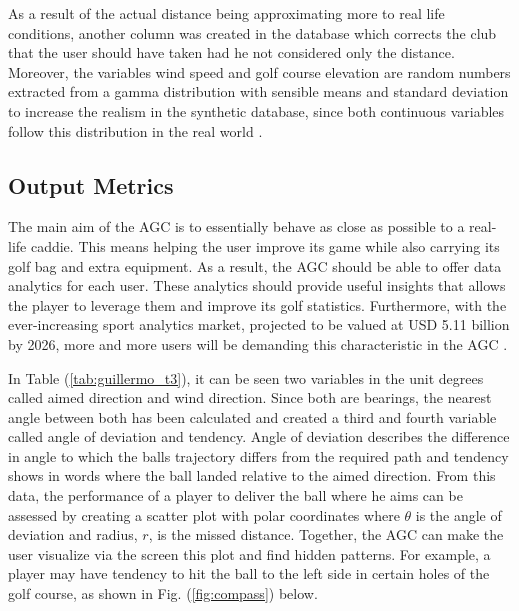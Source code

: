 \documentclass[11pt,landscape]{article}
\begin{document}
\begin{multicols}{3}
As a result of the actual distance being approximating more to real life
conditions, another column was created in the database which corrects the club
that the user should have taken had he not considered only the distance.
Moreover, the variables wind speed and golf course elevation are random numbers
extracted from a gamma distribution with sensible means and standard deviation
to increase the realism in the synthetic database, since both continuous
variables follow this distribution in the real world \cite{wind_dist}. 



\subsection{Output Metrics}
The main aim of the AGC is to essentially behave as close as possible to a
real-life caddie. This means helping the user improve its game while also
carrying its golf bag and extra equipment. As a result, the AGC should be able
to offer data analytics for each user. These analytics should provide useful
insights that allows the player to leverage them and improve its golf
statistics. Furthermore, with the ever-increasing sport analytics market,
projected to be valued at USD 5.11 billion by 2026,
more and more users will be demanding this characteristic in the AGC \cite{analytics}. 

In Table (\ref{tab:guillermo_t3}), it can be seen two variables in the unit degrees called aimed
direction and wind direction. Since both are bearings, the nearest angle between
both has been calculated and created a third and fourth variable called angle of
deviation and tendency. Angle of deviation describes the difference in angle to
which the balls trajectory differs from the required path and tendency shows in
words where the ball landed relative to the aimed direction. From this data, the
performance of a player to deliver the ball where he aims can be assessed by
creating a scatter plot with polar coordinates where $\theta$ is the angle of
deviation and radius, $r$, is the missed distance. Together, the AGC can make the
user visualize via the screen this plot and find hidden patterns. For example, a
player may have tendency to hit the ball to the left side in certain holes of
the golf course, as shown in Fig. (\ref{fig:compass}) below. 


\end{multicols}
\end{document}
